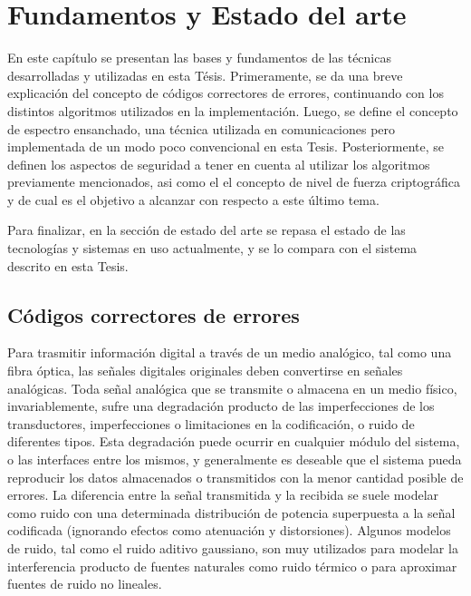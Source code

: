\chapter{Fundamentos y Estado del arte}

En este capítulo se presentan las bases y fundamentos de las técnicas desarrolladas y utilizadas en esta Tésis. 
Primeramente, se da una breve explicación del concepto de códigos correctores de errores, continuando con los distintos algoritmos utilizados en la implementación. Luego, se define el concepto de espectro ensanchado, una técnica utilizada en comunicaciones pero implementada de un modo poco convencional en esta Tesis. Posteriormente, se definen los aspectos de seguridad a tener en cuenta al utilizar los algoritmos previamente mencionados, asi como el el concepto de nivel de fuerza criptográfica y de cual es el objetivo a alcanzar con respecto a este último tema.

Para finalizar, en la sección de estado del arte se repasa el estado de las tecnologías y sistemas en uso actualmente, y se lo compara con el sistema descrito en esta Tesis.

\section{Códigos correctores de errores}
\label{cap2:ECC}
Para trasmitir información digital a través de un medio analógico, tal como una fibra óptica, las señales digitales originales deben convertirse en señales analógicas.
Toda señal analógica que se transmite o almacena en un medio físico, invariablemente, sufre una degradación producto de las imperfecciones de los transductores, imperfecciones o limitaciones en la codificación, o ruido de diferentes tipos. Esta degradación puede ocurrir en cualquier módulo del sistema, o las interfaces entre los mismos, y generalmente es deseable que el sistema pueda reproducir los datos almacenados o transmitidos con la menor cantidad posible de errores. La diferencia entre la señal transmitida y la recibida se suele modelar como ruido con una determinada distribución de potencia superpuesta a la señal codificada (ignorando efectos como atenuación y distorsiones). Algunos modelos de ruido, tal como el ruido aditivo gaussiano, son muy utilizados para modelar la interferencia producto de fuentes naturales como ruido térmico o para aproximar fuentes de ruido no lineales.

